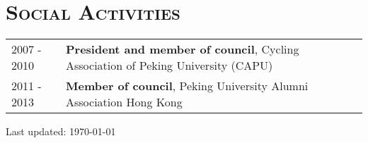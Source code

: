 \documentclass[letterpaper]{article}
\def\footerlink{}
\begin{document}
\section*{\textsc{Social Activities}}
\begin{tabular}{ll}
2007 - 2010     & \textbf{President and member of council}, Cycling Association of Peking University (CAPU) \vspace{.5em}\\
2011 - 2013     & \textbf{Member of council}, Peking University Alumni Association Hong Kong\\
\end{tabular}


\makeatletter \renewcommand\@biblabel[1]{[#1]} \makeatother



\makeatletter \renewcommand\@biblabel[1]{[#1]} \makeatother



\begin{center}
  \begin{footnotesize}
    Last updated: \today \\
  \end{footnotesize}
\end{center}
\end{document}
